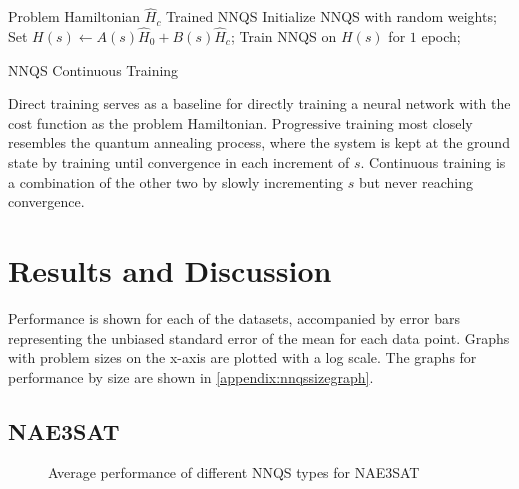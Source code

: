 \begin{algorithm}
    \begin{algorithmic}
    \Require Problem Hamiltonian $\hat{H}_c$
    \Ensure Trained NNQS
    \State Initialize NNQS with random weights;
    \State Set $H(s) \leftarrow A(s)\hat{H}_0 + B(s)\hat{H}_c$;
    \State Train NNQS on $H(s)$ for $1$ epoch;
    \EndFor
    \end{algorithmic}
    \caption{NNQS Continuous Training}
    \label{alg:continuous}
\end{algorithm}

Direct training serves as a baseline for directly training a neural network with the cost function as the problem Hamiltonian. Progressive training most closely resembles the quantum annealing process, where the system is kept at the ground state by training until convergence in each increment of $s$. Continuous training is a combination of the other two by slowly incrementing $s$ but never reaching convergence.

\section{Results and Discussion}
Performance is shown for each of the datasets, accompanied by error bars representing the unbiased standard error of the mean for each data point. Graphs with problem sizes on the x-axis are plotted with a log scale. The graphs for performance by size are shown in \autoref{appendix:nnqssizegraph}.

\subsection{NAE3SAT}

\begin{figure}[!htbp]
    \centering
    \hfill
    \caption{Average performance of different NNQS types for NAE3SAT}
    \label{nnqs-nae3sat-average}
\end{figure}

